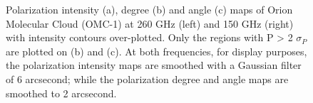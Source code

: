\documentclass[twocolumn, traditabstract]{aa}
\begin{document}
      \begin{figure}
  \caption{ Polarization intensity (a), degree (b) and angle (c) maps of Orion Molecular Cloud (OMC-1) at 260 GHz (left) and 150 GHz (right) with intensity contours over-plotted. Only the regions with P > 2 $\sigma_P$ are plotted on (b) and (c). At both frequencies, for display purposes, the polarization intensity maps are smoothed with a Gaussian filter of 6 arcsecond; while the polarization degree and angle maps are smoothed to 2 arcsecond.}
     \begin{center}
  	\setlength{\unitlength}{\columnwidth} 
\end{center}
\end{figure}
\end{document}
